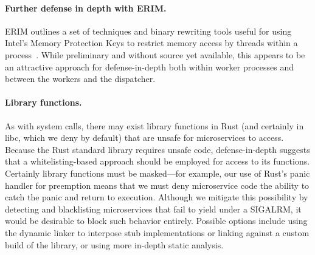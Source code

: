 \paragraph{Further defense in depth with ERIM.}
ERIM outlines a set of techniques and binary rewriting tools useful for using
Intel's Memory Protection Keys to restrict memory access by 
threads within a process~\cite{vahldiek2018erim}.  While preliminary and without
source yet available, this appears to be an attractive approach for
defense-in-depth both within worker processes and between the workers and the dispatcher.



\paragraph{Library functions.}
As with system calls, there may exist library functions in Rust (and certainly
in libc, which we deny by default) that are unsafe for microservices to access.
Because the Rust standard library requires unsafe
code, defense-in-depth suggests that a whitelisting-based approach should be
employed for access to its functions.  Certainly library functions must
be masked---for example, our use of Rust's panic handler for
preemption means that we must deny microservice code the ability to catch the
panic and return to execution.  Although we mitigate this possibility by
detecting and blacklisting microservices that fail to yield under a SIGALRM, it
would be desirable to block such behavior entirely.
Possible
options include using the dynamic linker to interpose stub implementations or
linking against a custom build of the library, or using more in-depth static analysis.




